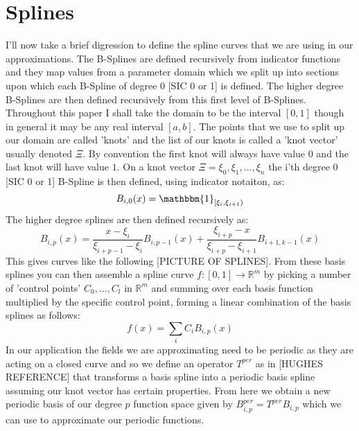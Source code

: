 \documentclass[a4paper, 11pt]{article}
\begin{document}
\section{Splines}
I'll now take a brief digression to define the spline curves that we are using in our approximations. The B-Splines are defined recursively from indicator functions and they map values from a parameter domain which we split up into sections upon which each B-Spline of degree 0 [SIC 0 or 1] is defined. The higher degree B-Splines are then defined recursively from this first level of B-Splines. Throughout this paper I shall take the domain to be the interval $[0, 1]$ though in general it may be any real interval $[a, b]$. The points that we use to split up our domain are called 'knots' and the list of our knots is called a 'knot vector' usually denoted $\Xi$. By convention the first knot will always have value $0$ and the last knot will have value $1$. On a knot vector $\Xi={\xi_0, \xi_1, ..., \xi_n}$ the i'th degree 0 [SIC 0 or 1] B-Spline is then defined, using indicator notaiton, as: 
\begin{equation*}
  B_{i,0}(x)=\mathbbm{1}_{[\xi_{i}, \xi_{i+1})}
\end{equation*}
The higher degree splines are then defined recursively as:
\begin{equation*}
  B_{i,p}(x) = \frac{x-\xi_i}{\xi_{i+p-1} - \xi_i}B_{i,p-1}(x) + \frac{\xi_{i+p}-x}{\xi_{i+p}-\xi_{i+1}}B_{i+1, k-1}(x)
\end{equation*}
This gives curves like the following [PICTURE OF SPLINES].
From these basis splines you can then assemble a spline curve $f:[0, 1]\rightarrow\mathbb{R}^m$ by picking a number of 'control points' $C_0, ... , C_l$ in $\mathbb{R}^m$ and summing over each basis function multiplied by the specific control point, forming a linear combination of the basis splines as follows:
\begin{equation*}
  f(x)=\sum_{i}C_iB_{i,p}(x)
\end{equation*}
In our application the fields we are approximating need to be periodic as they are acting on a closed curve and so we define an operator $T^{per}$ as in [HUGHES REFERENCE] that transforms a basis spline into a periodic basis spline assuming our knot vector has certain properties. From here we obtain a new periodic basis of our degree $p$ function space given by $B_{i,p}^{per}=T^{per}B_{i,p}$ which we can use to approximate our periodic functions. 

\pagebreak
\end{document}
